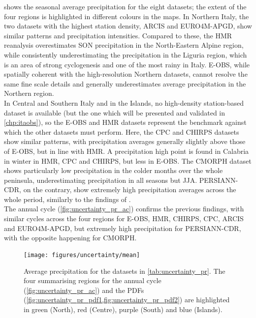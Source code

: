  shows the seasonal average precipitation for the eight datasets; the extent of the four regions is highlighted in different colours in the maps.
In Northern Italy, the two datasets with the highest station density, ARCIS and EURO4M-APGD, show similar patterns and precipitation intensities.
Compared to these, the HMR reanalysis overestimates SON precipitation in the North-Eastern Alpine region, while consistently underestimating the precipitation in the Liguria region, which is an area of strong cyclogenesis and one of the most rainy in Italy.
E-OBS, while spatially coherent with the high-resolution Northern datasets, cannot resolve the same fine scale details and generally underestimates average precipitation in the Northern region.\\
In Central and Southern Italy and in the Islands, no high-density station-based dataset is available (but the one which will be presented and validated in \cref{chp:itaobs}), so the E-OBS and HMR datasets represent the benchmark against which the other datasets must perform.
Here, the CPC and CHIRPS datasets show similar patterns, with precipitation averages generally slightly above those of E-OBS, but in line with HMR.
A precipitation high point is found in Calabria in winter in HMR, CPC and CHIRPS, but less in E-OBS.
The CMORPH dataset shows particularly low precipitation in the colder months over the whole peninsula, underestimating precipitation in all seasons but JJA. PERSIANN-CDR, on the contrary, show extremely high precipitation averages across the whole period, similarly to the findings of \citet{Prein2017}.\\
The annual cycle (\cref{fig:uncertainty_pr_ac}) confirms the previous findings, with similar cycles across the four regions for E-OBS, HMR, CHIRPS, CPC, ARCIS and EURO4M-APGD, but extremely high precipitation for PERSIANN-CDR, with the opposite happening for CMORPH.
\begin{figure}
    \centering
        \texttt{[image: figures/uncertainty/mean]}
    \decoRule
    \caption[Precipitation mean: uncertainty over Italy]{
        Average precipitation for the datasets in \cref{tab:uncertainty_pr}. The four summarising regions for the annual cycle (\cref{fig:uncertainty_pr_ac}) and the PDFs (\cref{fig:uncertainty_pr_pdf1,fig:uncertainty_pr_pdf2}) are highlighted in green (North), red (Centre), purple (South) and blue (Islands).
} \label{fig:uncertainty_pr_mean}
\end{figure}
